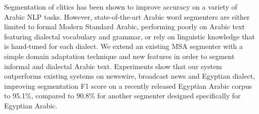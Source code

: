 Segmentation of clitics has been shown to improve accuracy on a variety of Arabic NLP tasks. However, state-of-the-art Arabic word segmenters are either limited to formal Modern Standard Arabic, performing poorly on Arabic text featuring dialectal vocabulary and grammar, or rely on linguistic knowledge that is hand-tuned for each dialect. We extend an existing MSA segmenter with a simple domain adaptation technique and new features in order to segment informal and dialectal Arabic text. Experiments show that our system outperforms existing systems on newswire, broadcast news and Egyptian dialect, improving segmentation F1 score on a recently released Egyptian Arabic corpus to 95.1\%, compared to 90.8\% for another segmenter designed specifically for Egyptian Arabic.

